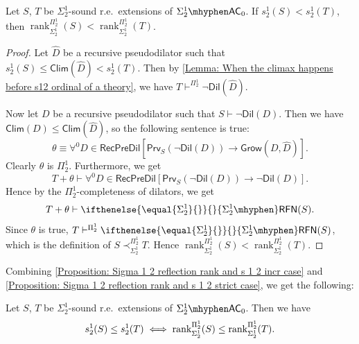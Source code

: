 \documentclass{mhkr}
\newcommand{\rank}{\operatorname{rank}}
\newcommand{\Clim}{\mathsf{Clim}}
\newcommand{\Grow}{\mathsf{Grow}}
\newcommand{\Dil}{\mathsf{Dil}}
\newcommand{\Prv}{\mathsf{Prv}}
\newcommand{\RecPreDil}{\mathsf{RecPreDil}}
\newcommand{\RFN}[1][]{\ifthenelse{\equal{#1}{}}{}{#1\mhyphen}\mathsf{RFN}}
\newcommand{\AC}{\mathsf{AC}}
\begin{document}
\begin{proposition} \label{Proposition: Sigma 1 2 reflection rank and s 1 2 strict case}
    Let $S$, $T$ be $\Sigma^1_2$-sound r.e.\ extensions of $\Sigma^1_2\mhyphen\AC_0$.
    If $s^1_2(S)< s^1_2(T)$, then $\rank^{\Pi^1_2}_{\Sigma^1_2}(S)< \rank^{\Pi^1_2}_{\Sigma^1_2}(T)$.
\end{proposition}
\begin{proof}
    Let $\hat{D}$ be a recursive pseudodilator such that $s^1_2(S) \le \Clim(\hat{D}) < s^1_2(T)$.
    Then by \autoref{Lemma: When the climax happens before s12 ordinal of a theory}, we have $T\vdash^{\Pi^1_2}\lnot\Dil(\hat{D})$.

    Now let $D$ be a recursive pseudodilator such that $S\vdash\lnot\Dil(D)$. Then we have $\Clim(D) \le \Clim(\hat{D})$, so the following sentence is true:
    \begin{equation*}
        \theta \equiv \forall^0 D\in \RecPreDil [\Prv_S(\lnot\Dil(D))\to \Grow(D,\hat{D})].
    \end{equation*}
    Clearly $\theta$ is $\Pi^1_2$.
    Furthermore, we get
    \begin{equation*}
        T + \theta \vdash \forall^0 D\in \RecPreDil [\Prv_S(\lnot\Dil(D))\to \lnot\Dil(D)].
    \end{equation*}
    Hence by the $\Pi^1_2$-completeness of dilators, we get
    \begin{equation*}
        T + \theta \vdash \RFN[\Sigma^1_2](S).
    \end{equation*}
    Since $\theta$ is true, $T \vdash^{\Pi^1_2} \RFN[\Sigma^1_2](S)$, which is the definition of $S\prec^{\Pi^1_2}_{\Sigma^1_2} T$. Hence $\rank^{\Pi^1_2}_{\Sigma^1_2}(S)<\rank^{\Pi^1_2}_{\Sigma^1_2}(T)$.
\end{proof}

Combining \autoref{Proposition: Sigma 1 2 reflection rank and s 1 2 incr case} and \autoref{Proposition: Sigma 1 2 reflection rank and s 1 2 strict case}, we get the following:
\begin{corollary} \label{Corollary: s 1 2 and Sigma 1 2 reflection rank coincides}
    \pushQED{\qed}
    Let $S$, $T$ be $\Sigma^1_2$-sound r.e.\ extensions of $\Sigma^1_2\mhyphen\AC_0$. Then we have
    \begin{equation*}
        s^1_2(S)\le s^1_2(T) \iff \rank^{\Pi^1_2}_{\Sigma^1_2}(S)\le \rank^{\Pi^1_2}_{\Sigma^1_2}(T).
        \qedhere 
    \end{equation*}
\end{corollary}
\end{document}
